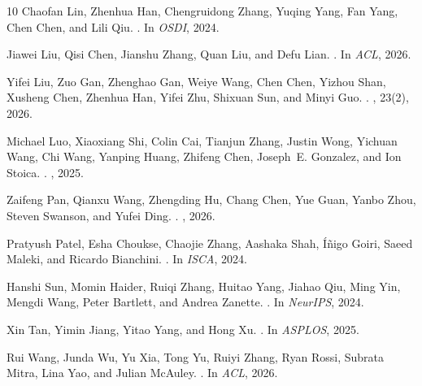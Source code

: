 \begin{thebibliography}{10}
Chaofan Lin, Zhenhua Han, Chengruidong Zhang, Yuqing Yang, Fan Yang, Chen Chen,
  and Lili Qiu.
.
\newblock In {\em OSDI}, 2024.

Jiawei Liu, Qisi Chen, Jianshu Zhang, Quan Liu, and Defu Lian.
.
\newblock In {\em ACL}, 2026.

Yifei Liu, Zuo Gan, Zhenghao Gan, Weiye Wang, Chen Chen, Yizhou Shan, Xusheng
  Chen, Zhenhua Han, Yifei Zhu, Shixuan Sun, and Minyi Guo.
.
,
  23(2), 2026.

Michael Luo, Xiaoxiang Shi, Colin Cai, Tianjun Zhang, Justin Wong, Yichuan
  Wang, Chi Wang, Yanping Huang, Zhifeng Chen, Joseph~E. Gonzalez, and Ion
  Stoica.
.
, 2025.

Zaifeng Pan, Qianxu Wang, Zhengding Hu, Chang Chen, Yue Guan, Yanbo Zhou,
  Steven Swanson, and Yufei Ding.
.
, 2026.

Pratyush Patel, Esha Choukse, Chaojie Zhang, Aashaka Shah, {\'I}{\~n}igo Goiri,
  Saeed Maleki, and Ricardo Bianchini.
.
\newblock In {\em ISCA}, 2024.

Hanshi Sun, Momin Haider, Ruiqi Zhang, Huitao Yang, Jiahao Qiu, Ming Yin,
  Mengdi Wang, Peter Bartlett, and Andrea Zanette.
.
\newblock In {\em NeurIPS}, 2024.

Xin Tan, Yimin Jiang, Yitao Yang, and Hong Xu.
.
\newblock In {\em ASPLOS}, 2025.

Rui Wang, Junda Wu, Yu Xia, Tong Yu, Ruiyi Zhang, Ryan Rossi, Subrata Mitra,
  Lina Yao, and Julian McAuley.
.
\newblock In {\em ACL}, 2026.


\end{thebibliography}
